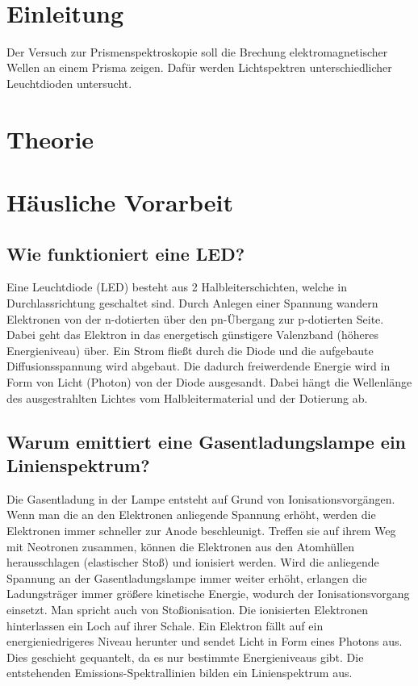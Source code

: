 \documentclass[a4paper]{scrartcl}
\def\header#1#2{
	\begin{center}
		{\Large #1}\\
		{#2}
	\end{center}
}
\numberwithin{equation}{subsection}
\begin{document}
\vspace{10pt}
\header{\HEADDING}{\SUBHEADDING}
	
\tableofcontents
	
\newpage
	
\section{Einleitung}
Der Versuch zur Prismenspektroskopie soll die Brechung elektromagnetischer Wellen an einem Prisma zeigen.
Dafür werden Lichtspektren unterschiedlicher Leuchtdioden untersucht.

\newpage
\section{Theorie}

\newpage
\section{Häusliche Vorarbeit}
\subsection{Wie funktioniert eine LED?}
Eine Leuchtdiode (LED) besteht aus 2 Halbleiterschichten, welche in Durchlassrichtung geschaltet sind.
Durch Anlegen einer Spannung wandern Elektronen von der n-dotierten über den pn-Übergang zur p-dotierten Seite.
Dabei geht das Elektron in das energetisch günstigere Valenzband (höheres Energieniveau) über.
Ein Strom fließt durch die Diode und die aufgebaute Diffusionsspannung wird abgebaut.
Die dadurch freiwerdende Energie wird in Form von Licht (Photon) von der Diode ausgesandt.
Dabei hängt die Wellenlänge des ausgestrahlten Lichtes vom Halbleitermaterial und der Dotierung ab. \cite{leifiled}

\subsection{Warum emittiert eine Gasentladungslampe ein Linienspektrum?}
Die Gasentladung in der Lampe entsteht auf Grund von Ionisationsvorgängen.
Wenn man die an den Elektronen anliegende Spannung erhöht, werden die Elektronen immer schneller zur Anode beschleunigt.
Treffen sie auf ihrem Weg mit Neotronen zusammen, können die Elektronen aus den Atomhüllen herausschlagen (elastischer Stoß) und ionisiert werden.
Wird die anliegende Spannung an der Gasentladungslampe immer weiter erhöht, erlangen die Ladungsträger immer größere kinetische Energie, wodurch der Ionisationsvorgang einsetzt.
Man spricht auch von Stoßionisation.
Die ionisierten Elektronen hinterlassen ein Loch auf ihrer Schale.
Ein Elektron fällt auf ein energieniedrigeres Niveau herunter und sendet Licht in Form eines Photons aus.
Dies geschieht gequantelt, da es nur bestimmte Energieniveaus gibt.
Die entstehenden Emissions-Spektrallinien bilden ein Linienspektrum aus. \cite{leifilampe}
\end{document}
